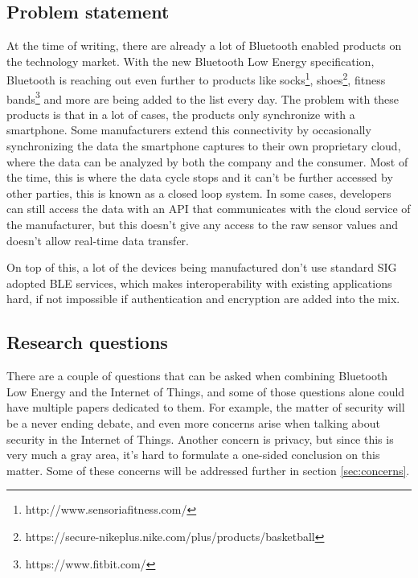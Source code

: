 \documentclass[pdftex,a4paper,12pt,twoside]{report}
\begin{document}
\subsection{Problem statement}
\label{subsec:problemstatement}
At the time of writing, there are already a lot of Bluetooth enabled products on the technology market. With the new Bluetooth Low Energy specification, Bluetooth is reaching out even further to products like socks\footnote{http://www.sensoriafitness.com/}, shoes\footnote{https://secure-nikeplus.nike.com/plus/products/basketball}, fitness bands\footnote{https://www.fitbit.com/} and more are being added to the list every day. The problem with these products is that in a lot of cases, the products only synchronize with a smartphone. Some manufacturers extend this connectivity by occasionally synchronizing the data the smartphone captures to their own proprietary cloud, where the data can be analyzed by both the company and the consumer. Most of the time, this is where the data cycle stops and it can't be further accessed by other parties, this is known as a closed loop system. In some cases, developers can still access the data with an API that communicates with the cloud service of the manufacturer, but this doesn't give any access to the raw sensor values and doesn't allow real-time data transfer.

On top of this, a lot of the devices being manufactured don't use standard SIG adopted BLE services, which makes interoperability with existing applications hard, if not impossible if authentication and encryption are added into the mix.

\subsection{Research questions}
\label{subsec:researchquestions}
There are a couple of questions that can be asked when combining Bluetooth Low Energy and the Internet of Things, and some of those questions alone could have multiple papers dedicated to them. For example, the matter of security will be a never ending debate, and even more concerns arise when talking about security in the Internet of Things. Another concern is privacy, but since this is very much a gray area, it's hard to formulate a one-sided conclusion on this matter. Some of these concerns will be addressed further in section \ref{sec:concerns}.
\end{document}
